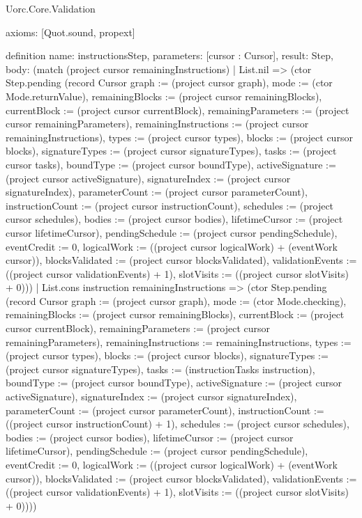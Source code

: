 \begin{lexlean}{Uorc.Core.Validation}
\begin{semanticmodule}
{  axioms: [Quot.sound, propext]
}

definition{
  name: instructionsStep,
  parameters: [cursor : Cursor],
  result: Step,
  body: (match (project cursor remainingInstructions)
    | List.nil => (ctor Step.pending (record Cursor {graph := (project cursor graph), mode := (ctor Mode.returnValue), remainingBlocks := (project cursor remainingBlocks), currentBlock := (project cursor currentBlock), remainingParameters := (project cursor remainingParameters), remainingInstructions := (project cursor remainingInstructions), types := (project cursor types), blocks := (project cursor blocks), signatureTypes := (project cursor signatureTypes), tasks := (project cursor tasks), boundType := (project cursor boundType), activeSignature := (project cursor activeSignature), signatureIndex := (project cursor signatureIndex), parameterCount := (project cursor parameterCount), instructionCount := (project cursor instructionCount), schedules := (project cursor schedules), bodies := (project cursor bodies), lifetimeCursor := (project cursor lifetimeCursor), pendingSchedule := (project cursor pendingSchedule), eventCredit := 0, logicalWork := ((project cursor logicalWork) + (eventWork cursor)), blocksValidated := (project cursor blocksValidated), validationEvents := ((project cursor validationEvents) + 1), slotVisits := ((project cursor slotVisits) + 0)}))
    | List.cons instruction remainingInstructions => (ctor Step.pending (record Cursor {graph := (project cursor graph), mode := (ctor Mode.checking), remainingBlocks := (project cursor remainingBlocks), currentBlock := (project cursor currentBlock), remainingParameters := (project cursor remainingParameters), remainingInstructions := remainingInstructions, types := (project cursor types), blocks := (project cursor blocks), signatureTypes := (project cursor signatureTypes), tasks := (instructionTasks instruction), boundType := (project cursor boundType), activeSignature := (project cursor activeSignature), signatureIndex := (project cursor signatureIndex), parameterCount := (project cursor parameterCount), instructionCount := ((project cursor instructionCount) + 1), schedules := (project cursor schedules), bodies := (project cursor bodies), lifetimeCursor := (project cursor lifetimeCursor), pendingSchedule := (project cursor pendingSchedule), eventCredit := 0, logicalWork := ((project cursor logicalWork) + (eventWork cursor)), blocksValidated := (project cursor blocksValidated), validationEvents := ((project cursor validationEvents) + 1), slotVisits := ((project cursor slotVisits) + 0)})))
}


\end{semanticmodule}
\end{lexlean}
